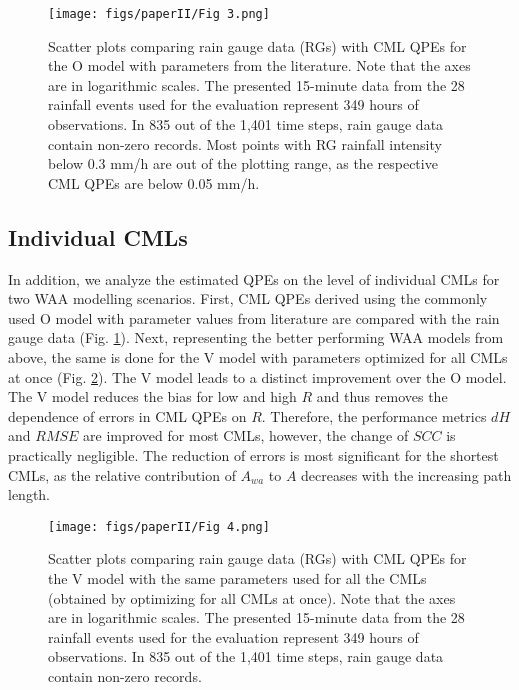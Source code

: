 \documentclass{ctuthesis}\usepackage[]{graphicx}\usepackage[]{color}
\begin{document}
\begin{figure}[h]
\begin{center}
\texttt{[image: figs/paperII/Fig 3.png]}
\caption{Scatter plots comparing rain gauge data (RGs) with CML QPEs for the O model with parameters from the literature. Note that the axes are in logarithmic scales. The presented 15-minute data from the 28 rainfall events used for the evaluation represent 349 hours of observations. In 835 out of the 1,401 time steps, rain gauge data contain non-zero records. Most points with RG rainfall intensity below 0.3 mm/h are out of the plotting range, as the respective CML QPEs are below 0.05 mm/h.} 
\label{fig:II_3}
\end{center}
\end{figure}



\subsection{Individual CMLs} \label{IIres2}

In addition, we analyze the estimated QPEs on the level of individual CMLs for two WAA modelling scenarios. First, CML QPEs derived using the commonly used O model with parameter values from literature are compared with the rain gauge data (Fig. \ref{fig:II_3}). Next, representing the better performing WAA models from above, the same is done for the V model with parameters optimized for all CMLs at once (Fig. \ref{fig:II_4}). The V model leads to a distinct improvement over the O model. The V model reduces the bias for low and high $R$ and thus removes the dependence of errors in CML QPEs on $R$. Therefore, the performance metrics $d\!H$ and $R\!M\!S\!E$ are improved for most CMLs, however, the change of $S\!C\!C$ is practically negligible. The reduction of errors is most significant for the shortest CMLs, as the relative contribution of $A_{wa}$ to $A$ decreases with the increasing path length.


\begin{figure}[h]
\begin{center}
\texttt{[image: figs/paperII/Fig 4.png]}
\caption{Scatter plots comparing rain gauge data (RGs) with CML QPEs for the V model with the same parameters used for all the CMLs (obtained by optimizing for all CMLs at once). Note that the axes are in logarithmic scales. The presented 15-minute data from the 28 rainfall events used for the evaluation represent 349 hours of observations. In 835 out of the 1,401 time steps, rain gauge data contain non-zero records.} 
\label{fig:II_4}
\end{center}
\end{figure}
\end{document}

